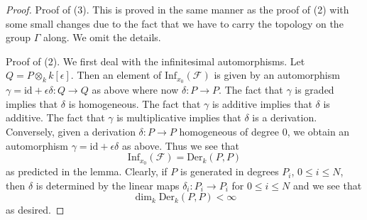 \begin{proof}
\medskip\noindent
Proof of (3). This is proved in the same manner as the proof of
(2) with some small changes due to the fact that we have to carry
the topology on the group $\Gamma$ along. We omit the details.

\medskip\noindent
Proof of (2). We first deal with the infinitesimal automorphisms.
Let $Q = P \otimes_k k[\epsilon]$.
Then an element of $\text{Inf}_{x_0}(\mathcal{F})$
is given by an automorphism
$\gamma = \text{id} + \epsilon \delta : Q \to Q$
as above where now $\delta : P \to P$.
The fact that $\gamma$ is graded implies that
$\delta$ is homogeneous.
The fact that $\gamma$ is additive implies that
$\delta$ is additive.
The fact that $\gamma$ is multiplicative implies that
$\delta$ is a derivation.
Conversely, given a derivation $\delta : P \to P$
homogeneous of degree $0$, we obtain an automorphism
$\gamma = \text{id} + \epsilon \delta$ as above.
Thus we see that
$$
\text{Inf}_{x_0}(\mathcal{F}) = \text{Der}_k(P, P)
$$
as predicted in the lemma.
Clearly, if $P$ is generated in degrees $P_i$,
$0 \leq i \leq N$, then $\delta$ is determined by
the linear maps $\delta_i : P_i \to P_i$ for
$0 \leq i \leq N$ and we see that
$$
\dim_k \text{Der}_k(P, P) < \infty
$$
as desired.


\end{proof}
